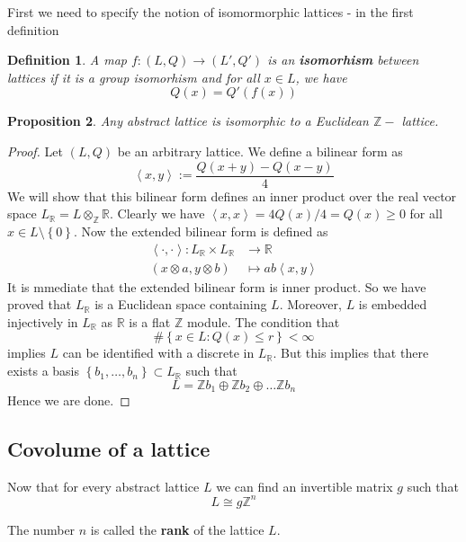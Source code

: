 \documentclass[12pt]{article} %
\newtheorem{definition}{Definition}[section]
\newtheorem{prop}[definition]{Proposition}
\newcommand{\tpoint}[1]{\subsection{#1}}
\begin{document}
First we need to specify the notion of isomormorphic lattices - in the first definition
\begin{definition}
    A map $f \colon (L,Q)   \to (L',Q')$  is an \textbf{isomorhism} between lattices if it is a group isomorhism and
    for all $x \in L$, we have
    \[Q(x) = Q'(f(x)) \]
\end{definition}
\begin{prop}\label{equiv-def}
    Any abstract lattice is isomorphic to a Euclidean $\mathbb{Z}-$ lattice.
\end{prop}
\begin{proof}
    Let $(L,Q)$ be an arbitrary lattice. We define a bilinear form as
    \[ \left\langle x,y \right\rangle := \dfrac{Q(x+y)-Q(x-y)}{4}\]
    We will show that this bilinear form defines an inner product over the real vector space $L_\mathbb{R} = L \otimes_\mathbb{Z} \mathbb{R}$.
    Clearly we have $\left\langle x,x \right\rangle = 4Q(x)/4 = Q(x) \ge 0$ for all $x  \in L \setminus \left\lbrace 0 \right\rbrace$.
    Now the extended bilinear form is defined as
    \begin{align*}
        \left\langle \cdot,\cdot \right\rangle  \colon L_\mathbb{R} \times L_\mathbb{R} & \to      \mathbb{R}                      \\
        (x\otimes a, y \otimes b)                                                       & \mapsto  ab\left\langle x,y\right\rangle
    \end{align*}
    It is mmediate that the extended bilinear form is inner product. So we have proved that
    $L_\mathbb{R}$ is a Euclidean space containing $L$. Moreover, $L$ is embedded injectively in $L_\mathbb{R}$
    as $\mathbb{R}$ is a flat $\mathbb{Z}$ module. The condition that
    \[ \# \left\lbrace x \in L: Q(x) \le r\right\rbrace < \infty\]
    implies $L$ can be identified with a discrete in $L_\mathbb{R}$. But this implies that there exists a basis
    $\left\lbrace b_1,\ldots,b_n\right\rbrace \subset L_\mathbb{R}$  such that
    \[L = \mathbb{Z}b_1\oplus \mathbb{Z}b_2\oplus \ldots \mathbb{Z}b_n\]
    Hence we are done.
\end{proof}
\tpoint{Covolume of a lattice}
Now that for every abstract lattice $L$ we can find an invertible matrix $g$ such that
\[ L  \cong g\mathbb{Z}^n\]

The number $n$ is called the \textbf{rank} of the lattice $L$.
\end{document}
